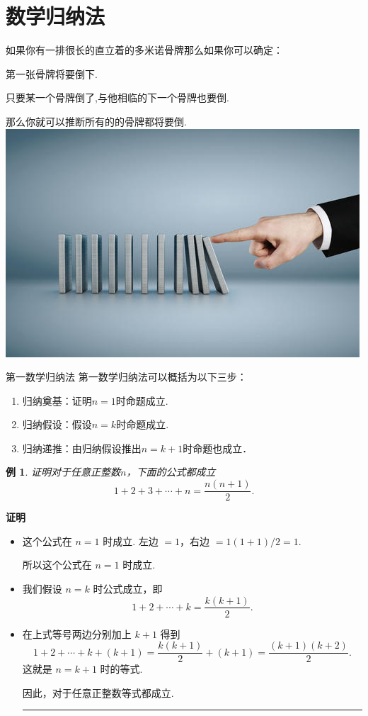 \documentclass[13pt,punct]{ctexbeamer}
\newtheorem{exa}{例}
\def\qed{\nopagebreak\hfill{\rule{4pt}{7pt}}\medbreak}
\def\pf{{\bf 证明~~ }}
\begin{document}
\section{数学归纳法}

\begin{frame}


如果你有一排很长的直立着的多米诺骨牌那么如果你可以确定：

第一张骨牌将要倒下.

只要某一个骨牌倒了,与他相临的下一个骨牌也要倒.

那么你就可以推断所有的的骨牌都将要倒. \\[15pt]
		\includegraphics[scale=0.4]{gupai.jpg}
\end{frame}


\begin{frame}{第一数学归纳法}
第一数学归纳法可以概括为以下三步：
\begin{enumerate}

\item 归纳奠基：证明$n=1$时命题成立.
\item 归纳假设：假设$n=k$时命题成立.
\item 归纳递推：由归纳假设推出$n=k+1$时命题也成立．
\end{enumerate}
\end{frame}

\begin{frame}
\begin{exa}
证明对于任意正整数$n$，下面的公式都成立
\[
1+2+3+\cdots+n=\frac{n(n+1)}{2}.
\]
\end{exa}
\pause
\pf
\begin{itemize}
\item 这个公式在 $n=1$ 时成立.  左边 $= 1$，右边 $= 1(1+ 1) / 2 = 1$.

所以这个公式在 $n=1$ 时成立.
\item 我们假设 $n=k$ 时公式成立，即
\[
1+2+\cdots+k=\frac{k(k+1)}{2}.
\]
\item 在上式等号两边分别加上 $k+1$ 得到
\[
1+2+\cdots+k+(k+1)=\frac{k(k+1)}{2}+(k+1) = \frac{(k+1)(k+2)}{2}.
\]
这就是 $n=k+1$ 时的等式.

因此，对于任意正整数等式都成立. \qed
\end{itemize}
\end{frame}
\end{document}
